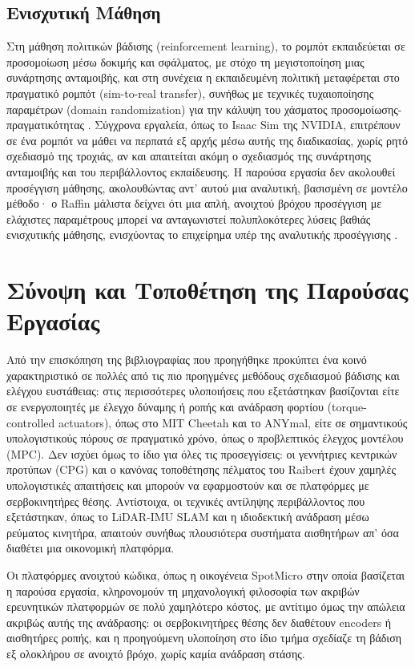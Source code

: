 \documentclass[11pt]{report}
\begin{document}
\subsection{Ενισχυτική Μάθηση}
\label{subsec:rl-litreview}
Στη μάθηση πολιτικών βάδισης (reinforcement learning), το ρομπότ εκπαιδεύεται
σε προσομοίωση μέσω δοκιμής και σφάλματος, με στόχο τη μεγιστοποίηση μιας
συνάρτησης ανταμοιβής, και στη συνέχεια η εκπαιδευμένη πολιτική μεταφέρεται
στο πραγματικό ρομπότ (sim-to-real transfer), συνήθως με τεχνικές
τυχαιοποίησης παραμέτρων (domain randomization) για την κάλυψη του χάσματος
προσομοίωσης-πραγματικότητας \cite{raffin_open-loop_2024,spotminimini2020github}.
Σύγχρονα εργαλεία, όπως το Isaac Sim της NVIDIA, επιτρέπουν σε ένα ρομπότ να
μάθει να περπατά εξ αρχής μέσω αυτής της διαδικασίας, χωρίς ρητό σχεδιασμό
της τροχιάς, αν και απαιτείται ακόμη ο σχεδιασμός της συνάρτησης ανταμοιβής
και του περιβάλλοντος εκπαίδευσης. Η παρούσα εργασία
δεν ακολουθεί προσέγγιση μάθησης, ακολουθώντας αντ' αυτού μια αναλυτική,
βασισμένη σε μοντέλο μέθοδο· ο Raffin μάλιστα δείχνει ότι μια απλή, ανοιχτού
βρόχου προσέγγιση με ελάχιστες παραμέτρους μπορεί να ανταγωνιστεί
πολυπλοκότερες λύσεις βαθιάς ενισχυτικής μάθησης, ενισχύοντας το επιχείρημα
υπέρ της αναλυτικής προσέγγισης \cite{raffin_open-loop_2024}.

\section{Σύνοψη και Τοποθέτηση της Παρούσας Εργασίας}
Από την επισκόπηση της βιβλιογραφίας που προηγήθηκε προκύπτει ένα κοινό
χαρακτηριστικό σε πολλές από τις πιο προηγμένες μεθόδους σχεδιασμού βάδισης
και ελέγχου ευστάθειας: στις περισσότερες υλοποιήσεις που εξετάστηκαν
βασίζονται είτε σε ενεργοποιητές με έλεγχο δύναμης ή ροπής και ανάδραση
φορτίου (torque-controlled actuators), όπως στο MIT Cheetah και το ANYmal,
είτε σε σημαντικούς υπολογιστικούς πόρους σε πραγματικό χρόνο, όπως ο
προβλεπτικός έλεγχος μοντέλου (MPC). Δεν ισχύει όμως το ίδιο για όλες τις
προσεγγίσεις: οι γεννήτριες κεντρικών προτύπων (CPG) και ο κανόνας
τοποθέτησης πέλματος του Raibert έχουν χαμηλές υπολογιστικές απαιτήσεις και
μπορούν να εφαρμοστούν και σε πλατφόρμες με σερβοκινητήρες θέσης. Αντίστοιχα,
οι τεχνικές αντίληψης περιβάλλοντος που εξετάστηκαν, όπως το LiDAR-IMU SLAM
και η ιδιοδεκτική ανάδραση μέσω ρεύματος κινητήρα, απαιτούν συνήθως
πλουσιότερα συστήματα αισθητήρων απ' όσα διαθέτει μια οικονομική πλατφόρμα.

Οι πλατφόρμες ανοιχτού κώδικα, όπως η οικογένεια SpotMicro στην οποία
βασίζεται η παρούσα εργασία, κληρονομούν τη μηχανολογική φιλοσοφία των
ακριβών ερευνητικών πλατφορμών σε πολύ χαμηλότερο κόστος, με αντίτιμο όμως
την απώλεια ακριβώς αυτής της ανάδρασης: οι σερβοκινητήρες θέσης δεν
διαθέτουν encoders ή αισθητήρες ροπής, και η προηγούμενη υλοποίηση στο ίδιο
τμήμα \cite{tsiatsianas_quadruped_2024} σχεδίαζε τη βάδιση εξ ολοκλήρου σε
ανοιχτό βρόχο, χωρίς καμία ανάδραση στάσης.
\end{document}

